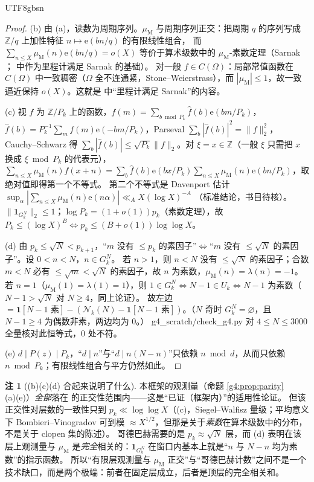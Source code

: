 \documentclass[11pt,a4paper]{article}
\newcommand{\Cnt}{\mathcal N}          %
\newcommand{\Om}{\Omega}               %
\newcommand{\Mob}{\mu_{\mathrm{M}}}    %
\newcommand{\Liou}{\lambda}            %
\newcommand{\ee}{\mathrm e}
\theoremstyle{plain}
\theoremstyle{definition}
\newtheorem{rem}[lem]{注}
\begin{document}
\begin{CJK}{UTF8}{gbsn}
\begin{proof}
(b) 由 (a)，读数为周期序列。$\Mob$ 与周期序列正交：把周期 $q$ 的序列写成 $\mathbb Z/q$ 上加性特征 $n\mapsto\ee(bn/q)$ 的有限线性组合，
而 $\sum_{n\le X}\Mob(n)\ee(bn/q)=o(X)$ 等价于算术级数中的 $\Mob$-素数定理（Sarnak \cite{Sar10}；\cite{DK15} 中作为里程计满足 Sarnak 的基础）。
对一般 $f\in C(\Om)$：局部常值函数在 $C(\Om)$ 中一致稠密（$\Om$ 全不连通紧，Stone--Weierstrass），而 $|\Mob|\le1$，故一致逼近保持 $o(X)$。这就是 \cite{DK15} 中“里程计满足 Sarnak”的内容。

(c) 视 $f$ 为 $\mathbb Z/P_k$ 上的函数，$f(m)=\sum_{b\bmod P_k}\hat f(b)\ee(bm/P_k)$，$\hat f(b)=P_k^{-1}\sum_mf(m)\ee(-bm/P_k)$，Parseval $\sum_b|\hat f(b)|^2=\|f\|_2^2$，
Cauchy--Schwarz 得 $\sum_b|\hat f(b)|\le\sqrt{P_k}\|f\|_2$。对 $\xi=x\in\mathbb Z$（一般 $\xi$ 只需把 $x$ 换成 $\xi\bmod P_k$ 的代表元），
$\sum_{n\le X}\Mob(n)f(x+n)=\sum_b\hat f(b)\ee(bx/P_k)\sum_{n\le X}\Mob(n)\ee(bn/P_k)$，取绝对值即得第一个不等式。
第二个不等式是 Davenport 估计 $\sup_\alpha|\sum_{n\le X}\Mob(n)\ee(n\alpha)|\ll_AX(\log X)^{-A}$ \cite{Dav37}（标准结论，书目待核）。
$\|\mathbf 1_{G_k^N}\|_2\le1$；$\log P_k=(1+o(1))p_k$（素数定理），故 $P_k\le(\log X)^B\iff p_k\le(B+o(1))\log\log X$。

(d) 由 $p_k\le\sqrt N<p_{k+1}$，“$m$ 没有 $\le p_k$ 的素因子”$\iff$“$m$ 没有 $\le\sqrt N$ 的素因子”。设 $0<n<N$，$n\in G_k^N$。
若 $n>1$，则 $n<N$ 没有 $\le\sqrt N$ 的素因子；合数 $m<N$ 必有 $\le\sqrt m<\sqrt N$ 的素因子，故 $n$ 为素数，$\Mob(n)=\Liou(n)=-1$。
若 $n=1$（$\Mob(1)=\Liou(1)=1$），则 $1\in G_k^N\iff N-1\in U_k\iff N-1$ 为素数（$N-1>\sqrt N$ 对 $N\ge4$，同上论证）。
故左边 $=\mathbf 1[N-1\text{ 素}]-(\Cnt_k(N)-\mathbf 1[N-1\text{ 素}])$。（$N$ 奇时 $G_k^N=\varnothing$，且 $N-1\ge4$ 为偶数非素，两边均为 $0$。）
g4\_scratch/check\_g4.py 对 $4\le N\le3000$ 全量核对此恒等式，$0$ 处不符。

(e) $d\mid P(z)\mid P_k$，“$d\mid n$”与“$d\mid n(N-n)$”只依赖 $n\bmod d$，从而只依赖 $n\bmod P_k$；有限线性组合与平方仍然如此。
\end{proof}

\begin{rem}[(b)(c)(d) 合起来说明了什么]\label{g4:rem:range}
本框架的观测量（命题 \ref{g4:prop:parity}(a)(e)）\emph{全部}落在 \cite{DK15,Sar10} 的正交性范围内——这是“已证（框架内）”的适用性论证。
但该正交性对层数的一致性只到 $p_k\ll\log\log X$（(c)，Siegel--Walfisz 量级；平均意义下 Bombieri--Vinogradov 可到模 $\approx X^{1/2}$，但那是关于\emph{素数}在算术级数中的分布，不是关于 clopen 集的陈述）。
哥德巴赫需要的是 $p_k\approx\sqrt N$ 层，而 (d) 表明在该层上观测量与 $\Mob$ 是\emph{完全}相关的：$\mathbf 1_{G_k^N}$ 在窗口内基本上就是“$n$ 与 $N-n$ 均为素数”的指示函数。
所以“有限层观测量与 $\Mob$ 正交”与“哥德巴赫计数”之间不是一个技术缺口，而是两个极端：前者在固定层成立，后者是顶层的完全相关和。
\end{rem}


\end{CJK}
\end{document}
